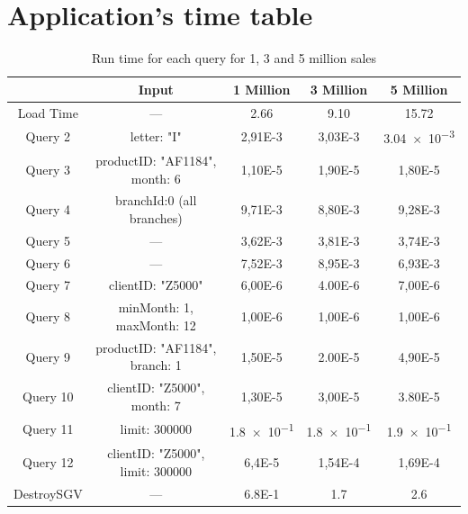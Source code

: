 \documentclass[a4paper]{report}
\begin{document}
\chapter{Application's time table}
\begin{table}[H]
    \begin{center}
        \begin{tabular}{| c | c | c | c | c |}
            \hline
            &  Input & 1 Million & 3 Million & 5 Million\\
            \hline
            Load Time  & --- & \num{2.66} & \num{9.10} & \num{15.72} \\
            \hline
            Query 2 & letter: "I"  & \num{2,91E-3} &  \num{3,03E-3} &  \num{3.04e-3}  \\
            \hline
            Query 3  & productID: "AF1184", month: 6   &  \num{1,10E-5} &	 \num{1,90E-5} &  \num{1,80E-5}\\
            \hline 
            Query 4  &  branchId:0 (all branches) &  \num{9,71E-3} &	 \num{8,80E-3} &  \num{9,28E-3} \\
            \hline
            Query 5 &  ---  &  \num{3,62E-3} &	 \num{3,81E-3} &  \num{3,74E-3}\\
            \hline
            Query 6  &  --- &  \num{7,52E-3} &	 \num{8,95E-3} &  \num{6,93E-3}\\
            \hline
            Query 7 &  clientID: "Z5000" &  \num{6,00E-6} &	 \num{4.00E-6} &  \num{7,00E-6}  \\
            \hline
            Query 8  &  minMonth: 1, maxMonth: 12 &  \num{1,00E-6} & \num{1,00E-6} &	 \num{1,00E-6} \\
            \hline
            Query 9  & productID: "AF1184", branch: 1 &  \num{1,50E-5} &	 \num{2.00E-5} &  \num{4,90E-5}\\
            \hline
            Query 10 & clientID: "Z5000", month: 7 &  \num{1,30E-5} &  \num{3,00E-5} &	 \num{3.80E-5} \\
            \hline
            Query 11 & limit: 300000 &  \num{1.8e-1} &  \num{1.8e-1} &	 \num{1.9e-1} \\
            \hline
            Query 12  & clientID: "Z5000", limit: 300000 &  \num{6,4E-5} &	 \num{1,54E-4} &  \num{1,69E-4}\\
            \hline
            DestroySGV & --- & \num{6.8E-1} & \num{1.7} & \num{2.6}\\
            \hline
            
        \end{tabular}
        \caption{Run time for each query for 1, 3 and 5 million sales}
        \label{tab:benches}
    \end{center}
\end{table}
\end{document}
